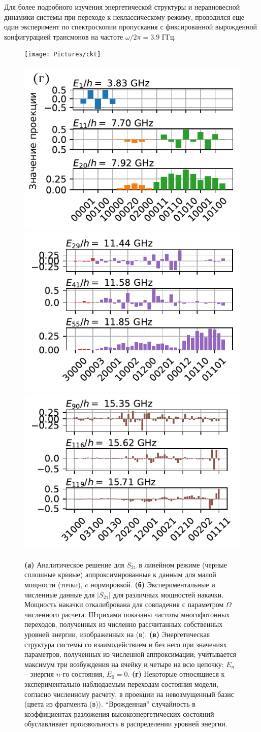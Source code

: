 \documentclass[14pt, a4paper]{extarticle}
\begin{document}
Для более подробного изучения энергетической структуры и неравновесной динамики системы при переходе к неклассическому режиму, проводился еще один эксперимент по спектроскопии пропускания с фиксированной вырожденной конфигурацией трансмонов на частоте $\omega/2\pi = 3.9$ ГГц.
\begin{figure}[h!]
	\texttt{[image: Pictures/ckt]}
	
	\includegraphics[width=.328\linewidth]{Pictures/eigenstates1}
	\includegraphics[width=.328\linewidth]{Pictures/eigenstates2}
	\includegraphics[width=.328\linewidth]{Pictures/eigenstates3}
	\caption{\textbf{(а)} Аналитическое решение для $S_{21}$ в линейном режиме (черные сплошные кривые) аппроксимированные к данным для малой мощности (точки), c нормировкой. \textbf{(б)} Экспериментальные и численные данные для $|S_{21}|$ для различных мощностей накачки. Мощность накачки откалибрована для совпадения с параметром $\Omega$ численного расчета. Штрихами показаны частоты многофотонных переходов, полученных из численно рассчитанных собственных уровней энергии, изображенных на (в). \textbf{(в)} Энергетическая структура системы со взаимодействием и без него при значениях параметров, полученных из численной аппроксимации; учитывается максимум три возбуждения на ячейку и четыре на всю цепочку; $E_n$ -- энергия $n$-го состояния, $E_0 =0$. \textbf{(г)} Некоторые относящиеся к экспериментально наблюдаемым переходам состояния модели, согласно численному расчету, в проекции на невозмущенный базис (цвета из фрагмента (в)). ``Врожденная'' случайность в коэффициентах разложения высокоэнергетических состояний обуславливает произвольность в распределении уровней энергии.}
	\label{fig:ckt}
\end{figure}
\end{document}
